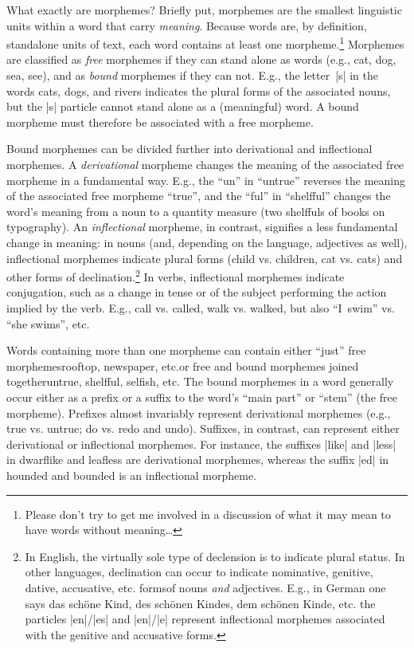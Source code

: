 \documentclass[11pt]{article}
\begin{document}
What exactly are morphemes? Briefly put, morphemes are the smallest linguistic units within a word that carry \emph{meaning}. Because words are, by definition, standalone units of text, each word contains at least one morpheme.\footnote{Please don't try to get me involved in a discussion of what it may mean to have words without meaning\dots} Morphemes are classified as \emph{free} morphemes if they can stand alone as words (e.g., cat, dog, sea, see), and as \emph{bound} morphemes if they can not. E.g., the letter~|s| in the words cats, dogs, and rivers indicates the plural forms of the associated nouns, but the |s| particle cannot stand alone as a (meaningful) word. A bound morpheme must therefore be associated with a free morpheme.

Bound morphemes can be divided further into derivational and inflectional morphemes. A \emph{derivational} morpheme changes the meaning of the associated free morpheme in a fundamental way. E.g., the \enquote{un} in \enquote{untrue} reverses the meaning of the associated free morpheme \enquote{true}, and the \enquote{ful} in \enquote{shelfful} changes the word's meaning from a noun to a quantity measure (two shelffuls of books on typography). An \emph{inflectional} morpheme, in contrast, signifies a less fundamental change in meaning: in nouns (and, depending on the language, adjectives as well), inflectional morphemes indicate plural forms (child vs. children, cat vs. cats) and other forms of declination.\footnote{In English, the virtually sole type of declension is to indicate plural status. In other languages, declination can occur to indicate nominative, genitive, dative, accusative, etc. forms\textemdash of nouns \emph{and} adjectives. E.g., in German one says das schöne Kind, des schönen Kindes, dem schönen Kinde, etc. the particles |en|/|es| and |en|/|e| represent inflectional morphemes associated with the genitive and accusative forms.} In verbs, inflectional morphemes indicate conjugation, such as a change in tense or of the subject performing the action implied by the verb. E.g., call vs. called, walk vs. walked, but also \enquote{I~swim} vs. \enquote{she swims}, etc. 

Words containing more than one morpheme can contain either \enquote{just} free morphemes\textemdash rooftop, newspaper, etc.\textemdash or free and bound morphemes joined together\textemdash untrue, shelfful, sel\mbox{fi}sh, etc. The bound morphemes in a word generally occur either as a prefix or a suffix to the word's \enquote{main part} or \enquote{stem} (the free morpheme). Prefixes almost invariably represent derivational morphemes (e.g., true vs. untrue; do vs. redo and undo). Suffixes, in contrast, can represent either derivational or inflectional morphemes. For instance, the suffixes |like| and |less| in dwarflike and leafless are derivational morphemes, whereas the suffix |ed| in hounded and bounded is an inflectional morpheme. 
\end{document}
